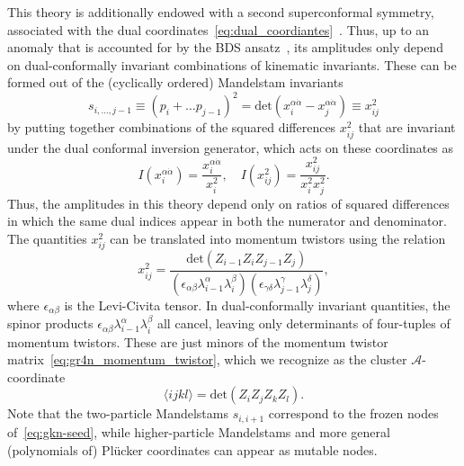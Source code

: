 \documentclass[11pt]{article}
\def\ket#1{\langle #1 \rangle}
\def\acoord{$\mathcal{A}$-coordinate}
\begin{document}
This theory is additionally endowed with a second superconformal symmetry, associated with the dual coordinates~\eqref{eq:dual_coordiantes}~\cite{Drummond:2006rz,Bern:2006ew,Bern:2007ct,Alday:2007hr,Drummond:2008vq}. Thus, up to an anomaly that is accounted for by the BDS ansatz~\cite{}, its amplitudes only depend on dual-conformally invariant combinations of kinematic invariants. These can be formed out of the (cyclically ordered) Mandelstam invariants
\begin{equation}
s_{i,\dots,j-1} \equiv (p_i + \dots p_{j-1})^2= \text{det}(x_i^{\alpha \dot \alpha} - x_j^{\alpha \dot \alpha}) \equiv x_{ij}^2 \label{eq:mandelstam_dual_coord}
\end{equation}
by putting together combinations of the squared differences $x_{ij}^2$ that are invariant under the dual conformal inversion generator, which acts on these coordinates as
\begin{equation}
I( x_i^{\alpha \dot \alpha}) = \frac{x_i^{\alpha \dot \alpha}}{x_i^2}, \quad  I(x_{ij}^2) = \frac{x_{ij}^2}{x_i^2 x_j^2}.
\end{equation}
Thus, the amplitudes in this theory depend only on ratios of squared differences in which the same dual indices appear in both the numerator and denominator. The quantities $x_{ij}^2$ can be translated into momentum twistors using the relation
\begin{equation}
x_{ij}^2 = \frac{\text{det}(Z_{i-1} Z_i Z_{j-1} Z_j)}{(\epsilon_{\alpha \beta} \lambda^\alpha_{i-1} \lambda^\beta_i) (\epsilon_{\gamma \delta} \lambda^\gamma_{j-1} \lambda^\delta_j)},
\end{equation}
where $\epsilon_{\alpha \beta}$ is the Levi-Civita tensor. In dual-conformally invariant quantities, the spinor products $\epsilon_{\alpha \beta} \lambda^\alpha_{i-1} \lambda^\beta_i$ all cancel, leaving only determinants of four-tuples of momentum twistors. These are just minors of the momentum twistor matrix~\eqref{eq:gr4n_momentum_twistor}, which we recognize as the cluster \acoord  
\begin{equation}
\ket{i j k l} = \text{det}(Z_i Z_j Z_k Z_l).
\end{equation}
Note that the two-particle Mandelstams $s_{i,i+1}$ correspond to the frozen nodes of~\eqref{eq:gkn-seed}, while higher-particle Mandelstams and more general (polynomials of) Pl\"ucker coordinates can appear as mutable nodes.
\end{document}
